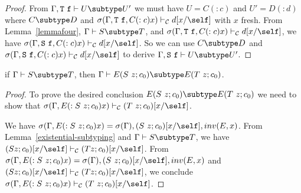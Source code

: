 \begin{proof}
From $\Gamma, {\tt T}\ {\tt f} \vdash U \subtype U'$
we must have $U = C(:c)$ and $U' = D(:d)$
where
$C \subtype D$
and 
$\sigma(\Gamma, {\tt T}\ {\tt f}, C(:c) x) \vdash_{\cal C} d[x/\self]$ 
with $x$ fresh.
From Lemma~\ref{lemmafour},
$\Gamma \vdash S \subtype T$,
and
$\sigma(\Gamma, {\tt T}\ {\tt f}, C(:c) x) \vdash_{\cal C} d[x/\self]$,
we have
$\sigma(\Gamma, {\tt S}\ {\tt f}, C(:c) x) \vdash_{\cal C} d[x/\self]$.
So we can use 
$C \subtype D$
and
$\sigma(\Gamma, {\tt S}\ {\tt f}, C(:c) x) \vdash_{\cal C} d[x/\self]$
to derive 
$\Gamma, {\tt S}\ {\tt f} \vdash U \subtype U'$.
\end{proof}

\begin{lemma}
\label{lemmafive} %
if   $\Gamma \vdash S \subtype T$,
then $\Gamma \vdash E(S\ z; c_0) \subtype E(T\ z; c_0)$.
\end{lemma}

\begin{proof}
To prove the desired conclusion $E(S\ z; c_0) \subtype E(T\ z; c_0)$ 
we need to show that
$\sigma(\Gamma, E(:S\ z; c_0) x) \vdash_{\cal C} (T\ z; c_0)[x/\self]$.

We have 
$\sigma(\Gamma, E(:S\ z; c_0) x) = 
 \sigma(\Gamma), (S\ z; c_0)[x/\self], inv(E,x)$.
From Lemma~\ref{existential-subtyping} and
$\Gamma \vdash S \subtype T$, 
we have
$(S z; c_0)[x/\self] \vdash_{\cal C} (T z; c_0)[x/\self]$.
From $\sigma(\Gamma, E(:S\ z; c_0) x) =
 \sigma(\Gamma), (S\ z; c_0)[x/\self], inv(E,x)$
and
$(S z; c_0)[x/\self] \vdash_{\cal C} (T z; c_0)[x/\self]$,
we conclude 
$\sigma(\Gamma, E(:S\ z; c_0) x) \vdash_{\cal C} (T\ z; c_0)[x/\self]$.
\end{proof}

